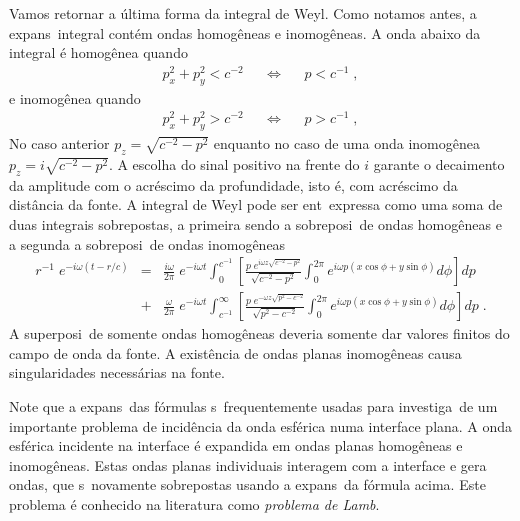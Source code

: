Vamos retornar a \'ultima forma da integral de Weyl. Como notamos antes, a
expans\ao\ integral cont\'em ondas homog\^eneas e inomog\^eneas. A onda abaixo
da integral \'e homog\^enea quando
\begin{eqnarray}
p_x^2 + p_y^2 < c^{-2} \;\;\;\;\; \Longleftrightarrow \;\;\;\;\; p < c^{-1} \; ,
\end{eqnarray}
e inomog\^enea quando
\begin{eqnarray}
p_x^2 + p_y^2 > c^{-2} \;\;\;\;\; \Longleftrightarrow \;\;\;\;\; p > c^{-1} \; ,
\end{eqnarray}
No caso anterior $p_z = \sqrt{c^{-2}-p^2}$ enquanto no caso de uma onda
inomog\^enea $p_z = i\sqrt{c^{-2}-p^2}$. A escolha do sinal positivo na frente
do $i$ garante o decaimento da amplitude com o acr\'escimo da profundidade,
isto \'e, com acr\'escimo da dist\^ancia da fonte. A integral de Weyl pode
ser ent\ao\ expressa como uma soma de duas integrais sobrepostas, a primeira
sendo a sobreposi\cao\ de ondas homog\^eneas e a segunda a sobreposi\cao\ de
ondas inomog\^eneas
\begin{eqnarray}
r^{-1} \; e^{-i\omega(t - r/c)} &=& \frac{i\omega}{2\pi} \; e^{-i\omega t}
\int_0^{c^{-1}} \left[\frac{p \; e^{i\omega z \sqrt{c^{-2}-p^2}}}
{\sqrt{c^{-2}-p^2}} \int_0^{2\pi} e^{i\omega p (x\cos\phi + y\sin\phi)}
d\phi \right] dp \\
&+& \frac{\omega}{2\pi} \; e^{-i\omega t} \int_{c^{-1}}^{\infty} \left[\frac{p \;
e^{-\omega z \sqrt{p^2-c^{-2}}}}{\sqrt{p^2-c^{-2}}} \int_0^{2\pi}
e^{i\omega p (x\cos\phi + y\sin\phi)} d\phi \right] dp \; .
\end{eqnarray}
A superposi\cao\ de somente ondas homog\^eneas deveria somente dar valores
finitos do campo de onda da fonte. A exist\^encia de ondas planas inomog\^eneas
causa singularidades necess\'arias na fonte.

Note que a expans\oes\ das f\'ormulas s\ao\ frequentemente usadas para
investiga\cao\ de um importante problema de incid\^encia da onda esf\'erica
numa interface plana. A onda esf\'erica incidente na interface \'e expandida
em ondas planas homog\^eneas e inomog\^eneas. Estas ondas planas individuais
interagem com a interface e gera ondas, que s\ao\ novamente sobrepostas
usando a expans\ao\ da f\'ormula acima. Este problema \'e conhecido na
literatura como {\it problema de Lamb}.

